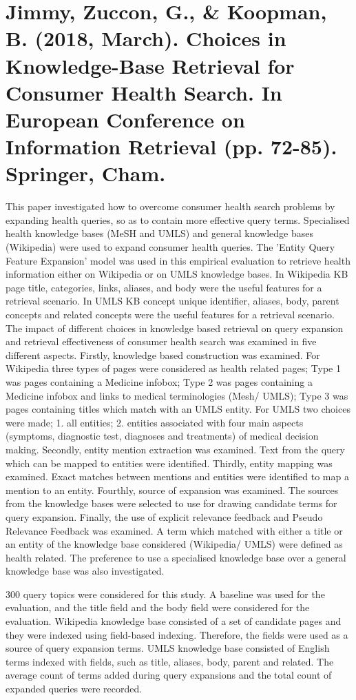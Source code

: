 \documentclass[]{article}
\begin{document}
\section{Jimmy, Zuccon, G., \& Koopman, B. (2018, March). Choices in Knowledge-Base Retrieval for Consumer Health Search. In European Conference on Information Retrieval (pp. 72-85). Springer, Cham.}  

This paper investigated how to overcome consumer health search problems by expanding health queries, so as to contain more effective query terms. Specialised health knowledge bases (MeSH and UMLS) and general knowledge bases (Wikipedia) were used to 
expand consumer health queries. The 'Entity Query Feature Expansion' model was used in this empirical evaluation to retrieve health information either on Wikipedia or on UMLS knowledge bases. In Wikipedia KB page title, categories, links, aliases, and body were the useful features for a retrieval scenario. In UMLS KB concept unique identifier, aliases, body, parent concepts and related concepts were the useful features for a retrieval scenario. The impact of different choices in knowledge based retrieval on query expansion and retrieval effectiveness of consumer health search was examined in five different aspects. Firstly, knowledge based construction was examined. For Wikipedia three types of pages were considered as health related pages; Type 1 was pages containing a Medicine infobox; Type 2 was pages containing a Medicine infobox and links to medical terminologies (Mesh/ UMLS); Type 3 was pages containing titles which match with an UMLS entity. For UMLS two choices were made; 1. all entities; 2. entities associated with four main aspects (symptoms, diagnostic test, diagnoses and treatments) of medical decision making. Secondly, entity mention extraction was examined. Text from the query which can be mapped to entities were identified. Thirdly, entity mapping was examined. Exact matches between mentions and entities were identified to map a mention to an entity. Fourthly, source of expansion was examined. The sources from the knowledge bases were selected to use for drawing candidate terms for query expansion. Finally, the use of explicit relevance feedback and Pseudo Relevance Feedback was examined. A term which matched with either a title or an entity of the knowledge base considered (Wikipedia/ UMLS) were defined as health related. The preference to use a specialised knowledge base over a general knowledge base was also investigated. 

300 query topics were considered for this study. A baseline was used for the evaluation, and the title field and the body field were considered for the evaluation. Wikipedia knowledge base consisted of a set of candidate pages and they were indexed using field-based indexing. Therefore, the fields were used as a source of query expansion terms. UMLS knowledge base consisted of English terms indexed with fields, such as title, aliases, body, parent and related. The average count of terms added during query expansions and the total count of expanded queries were recorded.
\end{document}
